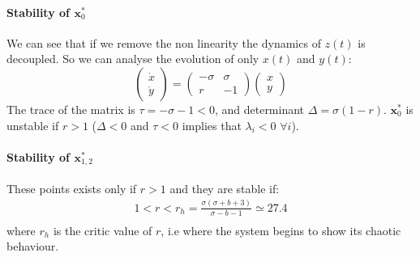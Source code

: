 \documentclass{article}
\begin{document}
\paragraph{Stability of $\boldsymbol{x}^{*}_0$}
We can see that if we remove the non linearity the dynamics of $z(t)$ is decoupled. So we can analyse the evolution of only $x(t)$ and $y(t)$:
\begin{equation}
\left(\begin{array}{l}
\dot{x} \\
\dot{y}
\end{array}\right)=\left(\begin{array}{cc}
-\sigma & \sigma \\
r & -1
\end{array}\right)\left(\begin{array}{l}
x \\
y
\end{array}\right)
\end{equation}
The trace of the matrix is $\tau=-\sigma -1 <0$, and determinant $\Delta=\sigma(1-r)$.
$\boldsymbol{x}^{*}_0$ is unstable if $r>1$ ($\Delta<0$ and $\tau<0$ implies that $\lambda_i<0$ $ \forall i$).
\paragraph{Stability of $\boldsymbol{x}^{*}_{1,2}$}
These points exists only if $r>1$ and they are stable if: 
\begin{equation}
\begin{split}
    1<r<r_h=\frac{\sigma(\sigma+b+3)}{\sigma-b-1}\simeq27.4\\
\end{split}
\end{equation}
where $r_h$ is the critic value of $r$, i.e where the system begins to show its chaotic behaviour. 
\end{document}
